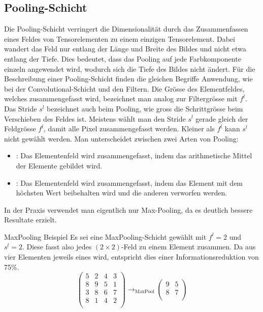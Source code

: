 \subsection{Pooling-Schicht}
Die Pooling-Schicht verringert die Dimensionalität durch das Zusammenfassen eines Feldes
von Tensorelementen zu einem einzigen Tensorelement.
Dabei wandert das Feld nur entlang der Länge und Breite des Bildes und
nicht etwa entlang der Tiefe. Dies bedeutet, dass das Pooling auf jede Farbkomponente
einzeln angewendet wird, wodurch sich die Tiefe des Bildes nicht ändert.
\para{}
Für die Beschreibung einer Pooling-Schicht finden die gleichen Begriffe
Anwendung, wie bei der Convolutional-Schicht und den Filtern.
Die Grösse des Elementfeldes, welches zusammengefasst wird, bezeichnet man analog zur
Filtergrösse mit $f^l$. Das Stride $s^l$ bezeichnet auch beim Pooling, wie
gross die Schrittgrösse beim Verschieben des Feldes ist. Meistens wählt man den
Stride $s^l$ gerade gleich der Feldgrösse $f^l$, damit alle Pixel
zusammengefasst werden. Kleiner als $f^l$ kann $s^l$ nicht gewählt werden.
\para{}
Man unterscheidet zwischen zwei Arten von Pooling:
\begin{itemize}
\item{: Das Elementenfeld wird zusammengefasst, indem
    das arithmetische Mittel der Elemente gebildet wird.}
\item{: Das Elementenfeld wird zusammengefasst, indem das
    Element mit dem höchsten Wert beibehalten wird und die anderen verworfen werden.}
\end{itemize}
In der Praxis verwendet man eigentlich nur Max-Pooling, da es deutlich bessere
Resultate erzielt.
\para{}
\begin{examplebox}{MaxPooling Beispiel}
  Es sei eine MaxPooling-Schicht gewählt mit $f^l = 2$ und $s^l = 2$.
  Diese fasst also jedes $(2 \times 2)$-Feld zu einem Element zusammen. Da aus
  vier Elementen jeweils eines wird, entspricht dies einer Informationsreduktion
  von 75\%.
  \para{}
  \begin{equation*}
    \begin{pmatrix}
      5 & 2 & 4 & 3 \\
      8 & 9 & 5 & 1 \\
      3 & 8 & 6 & 7 \\
      8 & 1 & 4 & 2 \\
    \end{pmatrix}
    \to_{\text{MaxPool}}
    \begin{pmatrix}
      9 & 5 \\
      8 & 7 \\
    \end{pmatrix}
  \end{equation*}
\end{examplebox}
